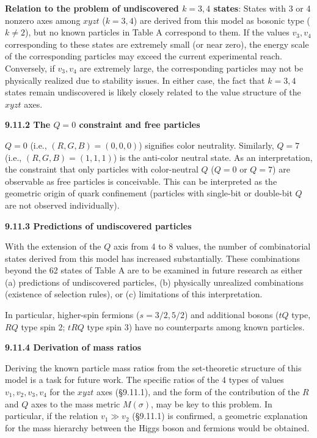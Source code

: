 \documentclass[
  a4paper,11pt]{article}
\theoremstyle{definition}
\theoremstyle{remark}
\begin{document}
\textbf{Relation to the problem of undiscovered \(k = 3, 4\) states}:
States with 3 or 4 nonzero axes among \(xyzt\) (\(k = 3, 4\)) are
derived from this model as bosonic type (\(k \neq 2\)), but no known
particles in Table A correspond to them. If the values \(v_3, v_4\)
corresponding to these states are extremely small (or near zero), the
energy scale of the corresponding particles may exceed the current
experimental reach. Conversely, if \(v_3, v_4\) are extremely large, the
corresponding particles may not be physically realized due to stability
issues. In either case, the fact that \(k = 3, 4\) states remain
undiscovered is likely closely related to the value structure of the
\(xyzt\) axes.

\textbf{9.11.2 The \(Q = 0\) constraint and free particles}

\(Q = 0\) (i.e., \((R,G,B) = (0,0,0)\)) signifies color neutrality.
Similarly, \(Q = 7\) (i.e., \((R,G,B) = (1,1,1)\)) is the anti-color
neutral state. As an interpretation, the constraint that only particles
with color-neutral \(Q\) (\(Q = 0\) or \(Q = 7\)) are observable as free
particles is conceivable. This can be interpreted as the geometric
origin of quark confinement (particles with single-bit or double-bit
\(Q\) are not observed individually).

\textbf{9.11.3 Predictions of undiscovered particles}

With the extension of the \(Q\) axis from 4 to 8 values, the number of
combinatorial states derived from this model has increased
substantially. These combinations beyond the 62 states of Table A are to
be examined in future research as either (a) predictions of undiscovered
particles, (b) physically unrealized combinations (existence of
selection rules), or (c) limitations of this interpretation.

In particular, higher-spin fermions (\(s = 3/2, 5/2\)) and additional
bosons (\(tQ\) type, \(RQ\) type spin 2; \(tRQ\) type spin 3) have no
counterparts among known particles.

\textbf{9.11.4 Derivation of mass ratios}

Deriving the known particle mass ratios from the set-theoretic structure
of this model is a task for future work. The specific ratios of the 4
types of values \(v_1, v_2, v_3, v_4\) for the \(xyzt\) axes (§9.11.1),
and the form of the contribution of the \(R\) and \(Q\) axes to the mass
metric \(M(\sigma)\), may be key to this problem. In particular, if the
relation \(v_1 \gg v_2\) (§9.11.1) is confirmed, a geometric explanation
for the mass hierarchy between the Higgs boson and fermions would be
obtained.
\end{document}
